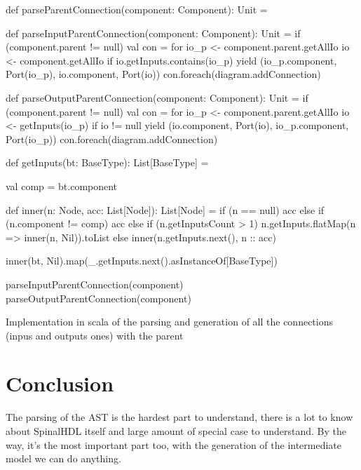 \begin{listing}[H]
  \centering
  \begin{scalacode}
  def parseParentConnection(component: Component): Unit = {

    def parseInputParentConnection(component: Component): Unit = {
      if (component.parent != null) {
        val con = for {
          io_p <- component.parent.getAllIo
          io <- component.getAllIo
          if io.getInputs.contains(io_p)
        } yield (io_p.component, Port(io_p), io.component, Port(io))
        con.foreach(diagram.addConnection)
      }
    }

    def parseOutputParentConnection(component: Component): Unit = {
      if (component.parent != null) {
        val con = for {
          io_p <- component.parent.getAllIo
          io <- getInputs(io_p)
          if io != null
        } yield (io.component, Port(io), io_p.component, Port(io_p))
        con.foreach(diagram.addConnection)
      }
    }

    def getInputs(bt: BaseType): List[BaseType] = {
      val comp = bt.component

      def inner(n: Node, acc: List[Node]): List[Node] = {
        if (n == null) acc
        else if (n.component != comp) {
          acc
        }
        else if (n.getInputsCount > 1) {
          n.getInputs.flatMap(n => inner(n, Nil)).toList
        }
        else {
          inner(n.getInputs.next(), n :: acc)
        }
      }

      inner(bt, Nil).map(_.getInputs.next().asInstanceOf[BaseType])
  }

    parseInputParentConnection(component)
    parseOutputParentConnection(component)
  }
\end{scalacode}
  \caption[Parsing and generation of the connections with the
  parent]{Implementation in scala of the parsing and generation of all the
    connections (inpus and outputs ones) with the parent}
  \label{lst:parse-parent-connection}
\end{listing}

\section{Conclusion}
\label{sec:ast-parsing-conclusion}

The parsing of the AST is the hardest part to understand, there is a lot to know
about SpinalHDL itself and large amount of special case to understand. By the
way, it's the most important part too, with the generation of the
intermediate model we can do anything.